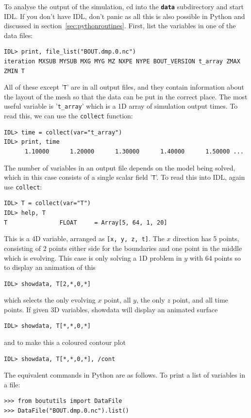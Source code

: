 \documentclass[12pt]{article}
\newcommand{\code}[1]{\texttt{#1}}
\newcommand{\file}[1]{\texttt{\bf #1}}
\begin{document}
To analyse the output of the simulation, cd into the \file{data} subdirectory
and start IDL.  If you don't have IDL, don't panic as all this is also possible
in Python and discussed in section~\ref{sec:pythonroutines}. First, list the
variables in one of the data files:
%
\begin{verbatim}
IDL> print, file_list("BOUT.dmp.0.nc")
iteration MXSUB MYSUB MXG MYG MZ NXPE NYPE BOUT_VERSION t_array ZMAX ZMIN T
\end{verbatim}
%
All of these except '\code{T}' are in all output files, and they contain
information about the layout of the mesh so that the data can be put in the
correct place. The most useful variable is '\code{t\_array}' which is a 1D
array of simulation output times. To read this, we can use the \code{collect}
function:
%
\begin{verbatim}
IDL> time = collect(var="t_array")
IDL> print, time
      1.10000      1.20000      1.30000      1.40000      1.50000 ...
\end{verbatim}
%
The number of variables in an output file depends on the model being solved,
which in this case consists of a single scalar field '\code{T}'. To read this
into IDL, again use \code{collect}:
%
\begin{verbatim}
IDL> T = collect(var="T")
IDL> help, T
T               FLOAT     = Array[5, 64, 1, 20]
\end{verbatim}
%
This is a 4D variable, arranged as \code{[x, y, z, t]}. The $x$ direction has 5
points, consisting of 2 points either side for the boundaries and one point in
the middle which is evolving. This case is only solving a 1D problem in $y$
with 64 points so to display an animation of this
%
\begin{verbatim}
IDL> showdata, T[2,*,0,*]
\end{verbatim}
%
which selects the only evolving $x$ point, all $y$, the only $z$ point, and all
time points.  If given 3D variables, showdata will display an animated surface
%
\begin{verbatim}
IDL> showdata, T[*,*,0,*]
\end{verbatim}
%
and to make this a coloured contour plot
%
\begin{verbatim}
IDL> showdata, T[*,*,0,*], /cont
\end{verbatim}
%
The equivalent commands in Python are as follows. To print a list of variables
in a file:
%
\begin{verbatim}
>>> from boututils import DataFile
>>> DataFile("BOUT.dmp.0.nc").list()
\end{verbatim}
\end{document}
